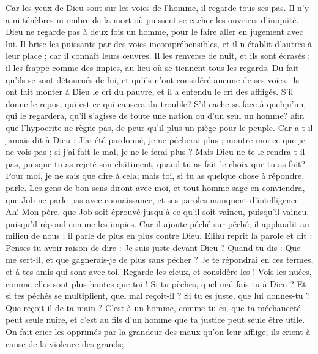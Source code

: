 \begin{multicols}{2}
Car les yeux de Dieu sont sur les voies de l'homme, il regarde tous ses pas.
Il n'y a ni ténèbres ni ombre de la mort où puissent se cacher les ouvriers d'iniquité.
Dieu ne regarde pas à deux fois un homme, pour le faire aller en jugement avec lui.
Il brise les puissants par des voies incompréhensibles, et il n établit d'autres à leur place ;
car il connaît leurs œuvres. Il les renverse de nuit, et ils sont écrasés ;
il les frappe comme des impies, au lieu où se tiennent tous les regards.
Du fait qu'ils se sont détournés de lui, et qu'ils n'ont considéré aucune de ses voies.
ils ont fait monter à Dieu le cri du pauvre, et il a entendu le cri des affligés.
S'il donne le repos, qui est-ce qui causera du trouble? S'il cache sa face à quelqu'un, qui le regardera, qu'il s'agisse de toute une nation ou d'un seul un homme?
afin que l'hypocrite ne règne pas, de peur qu'il plus un piège pour le peuple.
Car a-t-il jamais dit à Dieu : J'ai été pardonné, je ne pécherai plus ;
montre-moi ce que je ne vois pas ; si j'ai fait le mal, je ne le ferai plus ?
Mais Dieu ne te le rendra-t-il pas, puisque tu as rejeté son châtiment, quand tu as fait le choix que tu as fait? Pour moi, je ne sais que dire à cela; mais toi, si tu as quelque chose à répondre, parle.
Les gens de bon sens diront avec moi, et tout homme sage en conviendra,
que Job ne parle pas avec connaissance, et ses paroles manquent d'intelligence.
Ah! Mon père, que Job soit éprouvé jusqu'à ce qu'il soit vaincu, puisqu'il vaincu, puisqu'il répond comme les impies.
Car il ajoute péché sur péché; il applaudit au milieu de nous ; il parle de plus en plus contre Dieu.
\VerseOne{}Elihu reprit la parole et dit :
Penses-tu avoir raison de dire : Je suis juste devant Dieu ?
Quand tu dis : Que me sert-il, et que gagnerais-je de plus sans pécher ?
Je te répondrai en ces termes, et à tes amis qui sont avec toi.
Regarde les cieux, et considère-les ! Vois les nuées, comme elles sont plus hautes que toi !
Si tu pèches, quel mal fais-tu à Dieu ? Et si tes péchés se multiplient, quel mal reçoit-il ?
Si tu es juste, que lui donnes-tu ? Que reçoit-il de ta main ?
C'est à un homme, comme tu es, que ta méchanceté peut seule nuire, et c'est au fils d'un homme que ta justice peut seule être utile.
On fait crier les opprimés par la grandeur des maux qu'on leur afflige; ils crient à cause de la violence des grands;

\end{multicols}

